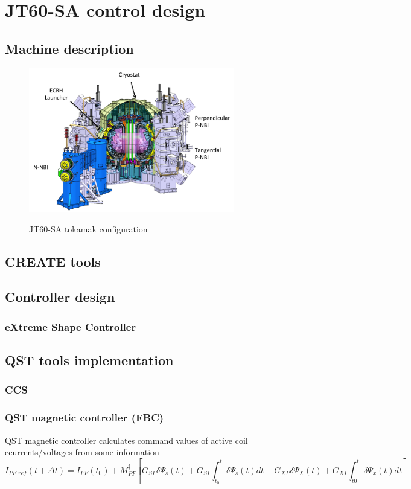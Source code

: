 \chapter{JT60-SA control design}

\section{Machine description}
\begin{figure}
	\centering
	\includegraphics[width=0.80\textwidth]{Chp3/JT60SA.png}
	\label{JT60schm}
	\caption{JT60-SA tokamak configuration}
\end{figure}

\section{CREATE tools}
\section{Controller design}
\subsection{eXtreme Shape Controller}
\section{QST tools implementation}
\subsection{CCS}
\subsection{QST magnetic controller (FBC)}
QST magnetic controller calculates command values of active coil ccurrents/voltages from some information
\begin{equation}
I_{PF\_ref}(t+\Delta t) = I_{PF}(t_0)+M^\dagger_{PF}\left[G_{SP}\delta\Psi_s(t)+G_{SI}\int_{t_0}^{t}\delta\Psi_s(t)dt+G_{XP}\delta\Psi_X(t)+G_{XI}\int_{t0}^{t}\delta\Psi_x(t)dt\right]
\end{equation}

